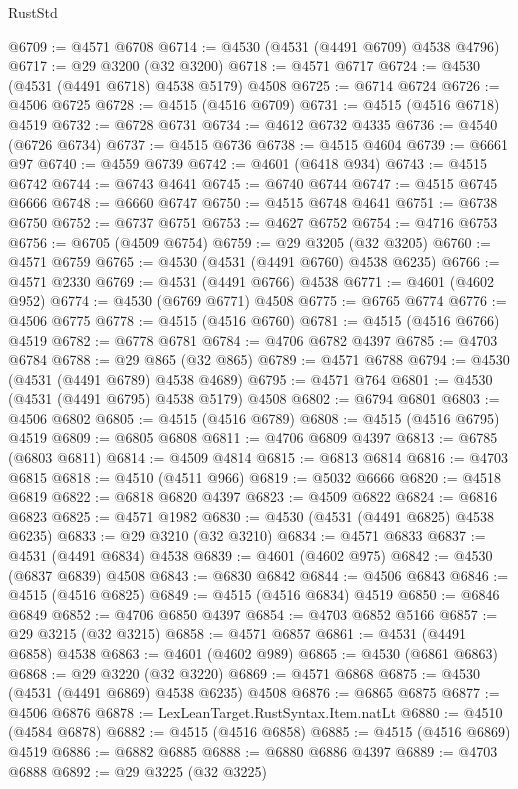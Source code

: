 \begin{lexlean}{RustStd}
\begin{coremodule}
{\begin{coremodule}
{{{{{{{{{{{{{{{{{{{{{{{{{{{{{{{{{{{{{{{{{{{{{{{{{{{{{{{@6709 := @4571 @6708
@6714 := @4530 (@4531 (@4491 @6709) @4538 @4796)
@6717 := @29 @3200 (@32 @3200)
@6718 := @4571 @6717
@6724 := @4530 (@4531 (@4491 @6718) @4538 @5179) @4508
@6725 := @6714 @6724
@6726 := @4506 @6725
@6728 := @4515 (@4516 @6709)
@6731 := @4515 (@4516 @6718) @4519
@6732 := @6728 @6731
@6734 := @4612 @6732 @4335
@6736 := @4540 (@6726 @6734)
@6737 := @4515 @6736
@6738 := @4515 @4604
@6739 := @6661 @97
@6740 := @4559 @6739
@6742 := @4601 (@6418 @934)
@6743 := @4515 @6742
@6744 := @6743 @4641
@6745 := @6740 @6744
@6747 := @4515 @6745 @6666
@6748 := @6660 @6747
@6750 := @4515 @6748 @4641
@6751 := @6738 @6750
@6752 := @6737 @6751
@6753 := @4627 @6752
@6754 := @4716 @6753
@6756 := @6705 (@4509 @6754)
@6759 := @29 @3205 (@32 @3205)
@6760 := @4571 @6759
@6765 := @4530 (@4531 (@4491 @6760) @4538 @6235)
@6766 := @4571 @2330
@6769 := @4531 (@4491 @6766) @4538
@6771 := @4601 (@4602 @952)
@6774 := @4530 (@6769 @6771) @4508
@6775 := @6765 @6774
@6776 := @4506 @6775
@6778 := @4515 (@4516 @6760)
@6781 := @4515 (@4516 @6766) @4519
@6782 := @6778 @6781
@6784 := @4706 @6782 @4397
@6785 := @4703 @6784
@6788 := @29 @865 (@32 @865)
@6789 := @4571 @6788
@6794 := @4530 (@4531 (@4491 @6789) @4538 @4689)
@6795 := @4571 @764
@6801 := @4530 (@4531 (@4491 @6795) @4538 @5179) @4508
@6802 := @6794 @6801
@6803 := @4506 @6802
@6805 := @4515 (@4516 @6789)
@6808 := @4515 (@4516 @6795) @4519
@6809 := @6805 @6808
@6811 := @4706 @6809 @4397
@6813 := @6785 (@6803 @6811)
@6814 := @4509 @4814
@6815 := @6813 @6814
@6816 := @4703 @6815
@6818 := @4510 (@4511 @966)
@6819 := @5032 @6666
@6820 := @4518 @6819
@6822 := @6818 @6820 @4397
@6823 := @4509 @6822
@6824 := @6816 @6823
@6825 := @4571 @1982
@6830 := @4530 (@4531 (@4491 @6825) @4538 @6235)
@6833 := @29 @3210 (@32 @3210)
@6834 := @4571 @6833
@6837 := @4531 (@4491 @6834) @4538
@6839 := @4601 (@4602 @975)
@6842 := @4530 (@6837 @6839) @4508
@6843 := @6830 @6842
@6844 := @4506 @6843
@6846 := @4515 (@4516 @6825)
@6849 := @4515 (@4516 @6834) @4519
@6850 := @6846 @6849
@6852 := @4706 @6850 @4397
@6854 := @4703 @6852 @5166
@6857 := @29 @3215 (@32 @3215)
@6858 := @4571 @6857
@6861 := @4531 (@4491 @6858) @4538
@6863 := @4601 (@4602 @989)
@6865 := @4530 (@6861 @6863)
@6868 := @29 @3220 (@32 @3220)
@6869 := @4571 @6868
@6875 := @4530 (@4531 (@4491 @6869) @4538 @6235) @4508
@6876 := @6865 @6875
@6877 := @4506 @6876
@6878 := LexLeanTarget.RustSyntax.Item.natLt
@6880 := @4510 (@4584 @6878)
@6882 := @4515 (@4516 @6858)
@6885 := @4515 (@4516 @6869) @4519
@6886 := @6882 @6885
@6888 := @6880 @6886 @4397
@6889 := @4703 @6888
@6892 := @29 @3225 (@32 @3225)
}}}}}}}}}}}}}}}}}}}}}}}}}}}}}}}}}}}}}}}}}}}}}}}}}}}}}}}
\end{coremodule}}
\end{coremodule}
\end{lexlean}
